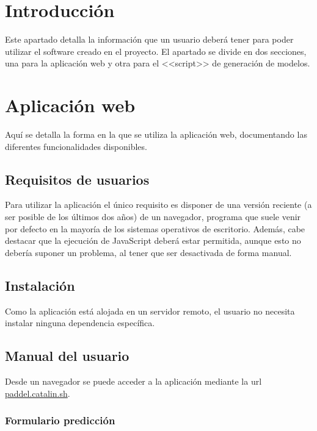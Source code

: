 \label{cha:Documentación de usuario}

\section{Introducción}

Este apartado detalla la información que un usuario deberá tener para poder
utilizar el software creado en el proyecto. El apartado se divide en dos
secciones, una para la aplicación web y otra para el <<script>> de generación de
modelos.

\section{Aplicación web}

Aquí se detalla la forma en la que se utiliza la aplicación web, documentando
las diferentes funcionalidades disponibles.

\subsection{Requisitos de usuarios}

Para utilizar la aplicación el único requisito es disponer de una versión
reciente (a ser posible de los últimos dos años) de un navegador, programa que
suele venir por defecto en la mayoría de los sistemas operativos de escritorio.
Además, cabe destacar que la ejecución de JavaScript deberá estar permitida,
aunque esto no debería suponer un problema, al tener que ser desactivada de
forma manual.

\subsection{Instalación}

Como la aplicación está alojada en un servidor remoto, el usuario no necesita
instalar ninguna dependencia específica.

\subsection{Manual del usuario}

Desde un navegador se puede acceder a la aplicación mediante la url
\href{https://paddle.catalin.sh}{paddel.catalin.sh}.

\subsubsection{Formulario predicción}

